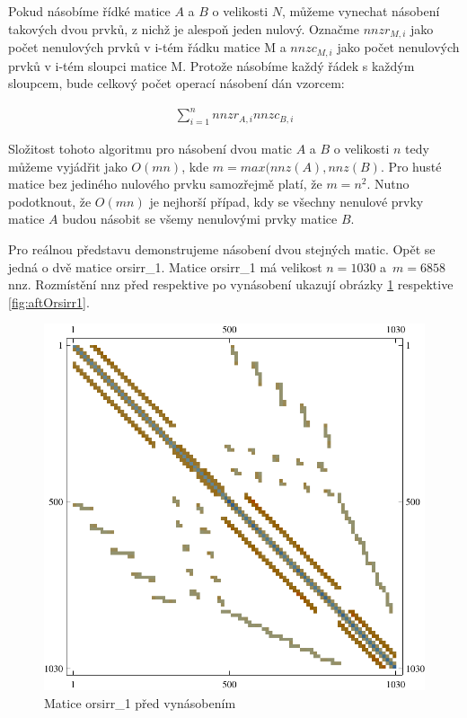 Pokud násobíme řídké matice $A$ a $B$ o velikosti $N$, můžeme vynechat násobení takových dvou prvků, z nichž je alespoň jeden nulový. Označme $nnzr_{M,i}$ jako počet nenulových prvků v i-tém řádku matice M a $nnzc_{M,i}$ jako počet nenulových prvků v i-tém sloupci matice M. Protože násobíme každý řádek s každým sloupcem, bude celkový počet operací násobení dán vzorcem:

\begin{figure}[htb]
\begin{align}
\sum_{i=1}^{n} nnzr_{A,i} nnzc_{B,i}
\end{align}
\end{figure}

Složitost tohoto algoritmu pro násobení dvou matic $A$ a $B$ o velikosti $n$ tedy můžeme vyjádřit jako $O(mn)$, kde $m = max(nnz(A),nnz(B)$. Pro husté matice bez jediného nulového prvku samozřejmě platí, že $m=n^2$. Nutno podotknout, že $O(mn)$ je nejhorší případ, kdy se všechny nenulové prvky matice $A$ budou násobit se všemy nenulovými prvky matice $B$.

Pro reálnou představu demonstrujeme násobení dvou stejných matic. Opět se jedná o dvě matice orsirr\_1. Matice orsirr\_1 má velikost $n=1030$ a~$m=6858$ nnz. Rozmístění nnz před respektive po vynásobení ukazují obrázky \ref{fig:befOrsirr1} respektive \ref{fig:aftOrsirr1}.


\begin{figure}[htb]
	\includegraphics[width=1.0\textwidth]{./images/orsirr_1_orig}
	\caption{Matice orsirr\_1 před vynásobením}
	\label{fig:befOrsirr1}
\end{figure}

